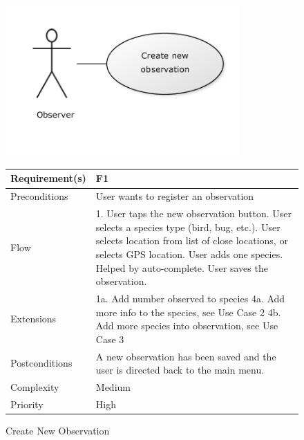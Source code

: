 \begin{figure}[!htb]
		\centering
		\includegraphics[width=0.8\textwidth]{reqspec/uc/cno.png}
		\caption{Create New Observation}
		\label{fig:cno}

\begin{tabular}{|l|p{}|}\hline
	Requirement(s)&F1\\\hline
	Preconditions&User wants to register an observation\\\hline
	Flow&1. User taps the new observation button\newline
	2. User selects a species type (bird, bug, etc.)\newline
	3. User selects location from list of close locations, or selects GPS location\newline
	4. User adds one species. Helped by auto-complete\newline
	5. User saves the observation.\\\hline
	Extensions& 1a. Add number observed to species\newline
	4a. Add more info to the species, see Use Case 2\newline
	4b. Add more species into observation, see Use Case 3\\\hline
	Postconditions&A new observation has been saved and the user is directed back to the main menu.\\\hline
	Complexity&Medium\\\hline
	Priority&High\\\hline
\end{tabular}
\end{figure}

\clearpage


